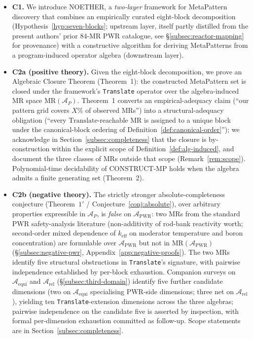 \documentclass[acmsmall, screen]{acmart}
\begin{document}
\begin{itemize}
  \item \textbf{C1.} We introduce NOETHER, a \emph{two-layer} framework for MetaPattern discovery that combines an empirically curated eight-block decomposition (Hypothesis~\ref{hyp:seven-blocks}; upstream layer, itself partly distilled from the present authors' prior 84-MR PWR catalogue, see \S\ref{subsec:reactor-mapping} for provenance) with a constructive algorithm for deriving MetaPatterns from a program-induced operator algebra (downstream layer).
  \item \textbf{C2a (positive theory).} Given the eight-block decomposition, we prove an Algebraic Closure Theorem (Theorem~1): the constructed MetaPattern set is closed under the framework's \texttt{Translate} operator over the algebra-induced MR space $\mathrm{MR}(\mathcal{A}_{P})$. Theorem~1 converts an empirical-adequacy claim (``our pattern grid covers $X\%$ of observed MRs'') into a structural-adequacy obligation (``every $\mathrm{Translate}$-reachable MR is assigned to a unique block under the canonical-block ordering of Definition~\ref{def:canonical-order}''); we acknowledge in Section~\ref{subsec:completeness} that the closure is by-construction within the explicit scope of Definition~\ref{def:alg-induced}, and document the three classes of MRs outside that scope (Remark~\ref{rem:scope}). Polynomial-time decidability of CONSTRUCT-MP holds when the algebra admits a finite generating set (Theorem~2).
  \item \textbf{C2b (negative theory).} The strictly stronger absolute-completeness conjecture (Theorem~$1'$ / Conjecture~\ref{conj:absolute}), over arbitrary properties expressible in $\mathcal{A}_P$, is \emph{false} on $\mathcal{A}_{\mathrm{PWR}}$: two MRs from the standard PWR safety-analysis literature (non-additivity of rod-bank reactivity worth; second-order mixed dependence of $k_{\mathrm{eff}}$ on moderator temperature and boron concentration) are formulable over $\mathcal{A}_{\mathrm{PWR}}$ but not in $\mathrm{MR}(\mathcal{A}_{\mathrm{PWR}})$ (\S\ref{subsec:negative-pwr}, Appendix~\ref{app:negative-proofs}). The two MRs identify five structural obstructions in \texttt{Translate}'s signature, with pairwise independence established by per-block exhaustion. Companion surveys on $\mathcal{A}_{\mathrm{equi}}$ and $\mathcal{A}_{\mathrm{rel}}$ (\S\ref{subsec:third-domain}) identify five further candidate dimensions (two on $\mathcal{A}_{\mathrm{equi}}$ specialising PWR-side dimensions; three net on $\mathcal{A}_{\mathrm{rel}}$), yielding ten \texttt{Translate}-extension dimensions across the three algebras; pairwise independence on the candidate five is asserted by inspection, with formal per-dimension exhaustion committed as follow-up. Scope statements are in Section~\ref{subsec:completeness}.

\end{itemize}
\end{document}
